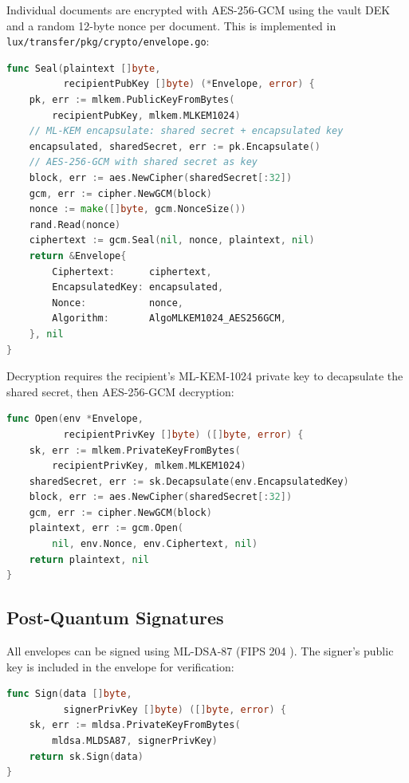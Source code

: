 Individual documents are encrypted with AES-256-GCM using the vault DEK
and a random 12-byte nonce per document.  This is implemented in
\texttt{lux/transfer/pkg/crypto/envelope.go}:

\begin{lstlisting}[language=Go,caption={envelope.go: ML-KEM + AES-256-GCM envelope}]
func Seal(plaintext []byte,
          recipientPubKey []byte) (*Envelope, error) {
    pk, err := mlkem.PublicKeyFromBytes(
        recipientPubKey, mlkem.MLKEM1024)
    // ML-KEM encapsulate: shared secret + encapsulated key
    encapsulated, sharedSecret, err := pk.Encapsulate()
    // AES-256-GCM with shared secret as key
    block, err := aes.NewCipher(sharedSecret[:32])
    gcm, err := cipher.NewGCM(block)
    nonce := make([]byte, gcm.NonceSize())
    rand.Read(nonce)
    ciphertext := gcm.Seal(nil, nonce, plaintext, nil)
    return &Envelope{
        Ciphertext:      ciphertext,
        EncapsulatedKey: encapsulated,
        Nonce:           nonce,
        Algorithm:       AlgoMLKEM1024_AES256GCM,
    }, nil
}
\end{lstlisting}

Decryption requires the recipient's ML-KEM-1024 private key to
decapsulate the shared secret, then AES-256-GCM decryption:

\begin{lstlisting}[language=Go,caption={envelope.go: decryption path}]
func Open(env *Envelope,
          recipientPrivKey []byte) ([]byte, error) {
    sk, err := mlkem.PrivateKeyFromBytes(
        recipientPrivKey, mlkem.MLKEM1024)
    sharedSecret, err := sk.Decapsulate(env.EncapsulatedKey)
    block, err := aes.NewCipher(sharedSecret[:32])
    gcm, err := cipher.NewGCM(block)
    plaintext, err := gcm.Open(
        nil, env.Nonce, env.Ciphertext, nil)
    return plaintext, nil
}
\end{lstlisting}

\subsection{Post-Quantum Signatures}

All envelopes can be signed using ML-DSA-87 (FIPS 204 \cite{fips204}).
The signer's public key is included in the envelope for verification:

\begin{lstlisting}[language=Go,caption={envelope.go: ML-DSA-87 signing}]
func Sign(data []byte,
          signerPrivKey []byte) ([]byte, error) {
    sk, err := mldsa.PrivateKeyFromBytes(
        mldsa.MLDSA87, signerPrivKey)
    return sk.Sign(data)
}
\end{lstlisting}

